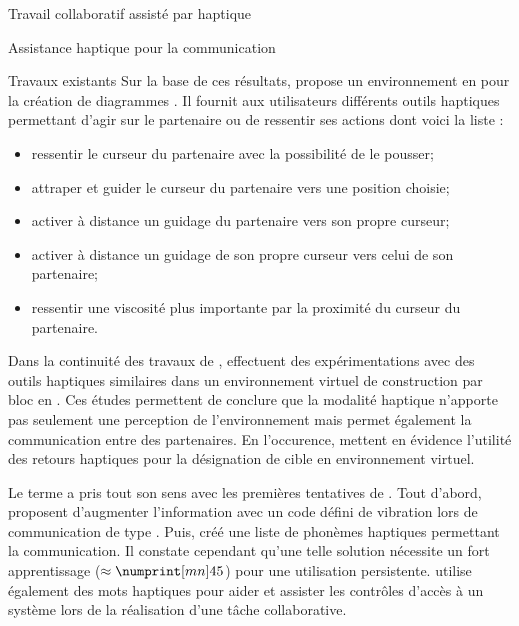\documentclass[myfrancais,ngerman,english,frenchb]{mythesis}
\begin{document}
\begin{mychapter}{Travail collaboratif assisté par haptique}
\begin{mysection}{Assistance haptique pour la communication}
\begin{mysubsection}{Travaux existants}
				Sur la base de ces résultats,  propose un environnement en \myTwoD pour la création de diagrammes .
				Il fournit aux utilisateurs différents outils haptiques permettant d'agir sur le partenaire ou de ressentir ses actions dont voici la liste :
				\begin{itemize}
					\item ressentir le curseur du partenaire avec la possibilité de le pousser;
					\item attraper et guider le curseur du partenaire vers une position choisie;
					\item activer à distance un guidage du partenaire vers son propre curseur;
					\item activer à distance un guidage de son propre curseur vers celui de son partenaire;
					\item ressentir une viscosité plus importante par la proximité du curseur du partenaire.
				\end{itemize}

				Dans la continuité des travaux de ,  effectuent des expérimentations avec des outils haptiques similaires dans un environnement virtuel de construction par bloc en \myThreeD.
				Ces études permettent de conclure que la modalité haptique n'apporte pas seulement une perception de l'environnement mais permet également la communication entre des partenaires.
				En l'occurence,  mettent en évidence l'utilité des retours haptiques pour la désignation de cible en environnement virtuel.

				Le terme  a pris tout son sens avec les premières tentatives de .
				Tout d'abord,  proposent d'augmenter l'information avec un code défini de vibration lors de communication de type .
				Puis,  créé une liste de phonèmes haptiques permettant la communication.
				Il constate cependant qu'une telle solution nécessite un fort apprentissage ($\approx \mynum[mn]{45}$) pour une utilisation persistente.
				 utilise également des mots haptiques pour aider et assister les contrôles d'accès à un système lors de la réalisation d'une tâche collaborative.


\end{mysubsection}
\end{mysection}
\end{mychapter}
\end{document}
